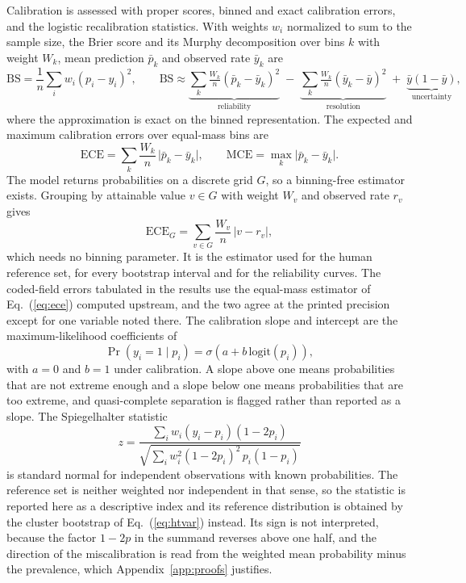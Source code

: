 Calibration is assessed with proper scores, binned and exact calibration errors, and the
logistic recalibration statistics. With weights $w_i$ normalized to sum to the sample size,
the Brier score and its Murphy decomposition over bins $k$ with weight $W_k$, mean prediction
$\bar{p}_k$ and observed rate $\bar{y}_k$ are
\begin{equation}
\mathrm{BS} = \frac{1}{n}\sum_i w_i (p_i - y_i)^2,\qquad
\mathrm{BS} \approx \underbrace{\sum_k \tfrac{W_k}{n}(\bar{p}_k - \bar{y}_k)^2}_{\text{reliability}}
\;-\; \underbrace{\sum_k \tfrac{W_k}{n}(\bar{y}_k - \bar{y})^2}_{\text{resolution}}
\;+\; \underbrace{\bar{y}(1-\bar{y})}_{\text{uncertainty}},
\label{eq:brier}
\end{equation}
where the approximation is exact on the binned representation. The expected and maximum
calibration errors over equal-mass bins are
\begin{equation}
\mathrm{ECE} = \sum_k \frac{W_k}{n}\,\bigl|\bar{p}_k - \bar{y}_k\bigr|,\qquad
\mathrm{MCE} = \max_k \bigl|\bar{p}_k - \bar{y}_k\bigr|.
\label{eq:ece}
\end{equation}
The model returns probabilities on a discrete grid $G$, so a binning-free estimator exists.
Grouping by attainable value $v \in G$ with weight $W_v$ and observed rate $r_v$ gives
\begin{equation}
\mathrm{ECE}_G = \sum_{v \in G} \frac{W_v}{n}\,\bigl|v - r_v\bigr|,
\label{eq:ecegrid}
\end{equation}
which needs no binning parameter. It is the estimator used for the human reference set, for every bootstrap interval and for the reliability curves. The coded-field errors tabulated in the results use the equal-mass estimator of Eq.~(\ref{eq:ece}) computed upstream, and the two agree at the printed precision except for one variable noted there. The calibration slope and intercept are the maximum-likelihood coefficients of
\begin{equation}
\Pr(y_i = 1 \mid p_i) = \sigma\!\left(a + b\,\mathrm{logit}(p_i)\right),
\label{eq:cox}
\end{equation}
with $a = 0$ and $b = 1$ under calibration. A slope above one means probabilities that are
not extreme enough and a slope below one means probabilities that are too extreme, and
quasi-complete separation is flagged rather than reported as a slope. The Spiegelhalter
statistic
\begin{equation}
z = \frac{\sum_i w_i (y_i - p_i)(1 - 2p_i)}{\sqrt{\sum_i w_i^2 (1 - 2p_i)^2\, p_i (1 - p_i)}}
\label{eq:spieg}
\end{equation}
is standard normal for independent observations with known probabilities. The reference set
is neither weighted nor independent in that sense, so the statistic is reported here as a
descriptive index and its reference distribution is obtained by the cluster bootstrap of
Eq.~(\ref{eq:htvar}) instead. Its sign is not interpreted, because the factor $1 - 2p$ in the
summand reverses above one half, and the direction of the miscalibration is read from the
weighted mean probability minus the prevalence, which Appendix~\ref{app:proofs} justifies.

